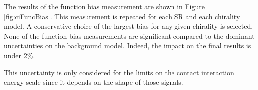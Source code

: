 The results of the function bias measurement are shown in Figure \ref{fig:ciFuncBias}.
This measurement is repeated for each SR and each chirality model.
A conservative choice of the largest bias for any given chirality is selected.
None of the function bias measurements are significant compared to the dominant uncertainties on the background model.
Indeed, the impact on the final results is under 2\%.

This uncertainty is only considered for the limits on the contact interaction energy scale \lam since it depends on the shape of those signals.

